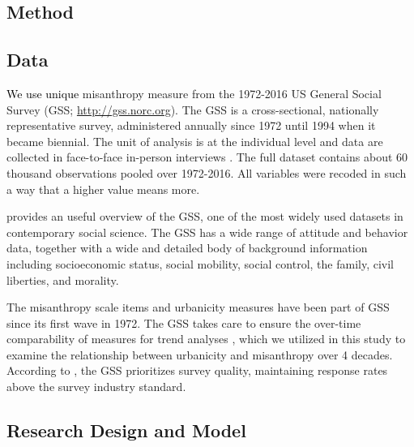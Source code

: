 \documentclass[11pt, letterpaper]{article}
\newcommand{\hilite}[1]{\textcolor{black}{#1}}
\begin{document}
\begin{spacing}{1.4}

\section*{Method} 

\subsection*{Data}

\hilite{We use unique} misanthropy measure from the 1972-2016 US General Social Survey (GSS;
\url{http://gss.norc.org}). The GSS is a cross-sectional, nationally
representative survey, administered annually since 1972 until 1994 when it
became biennial. The unit of analysis is at the individual level and data are collected in face-to-face in-person interviews \citep{davis07}. The full dataset contains about 60 thousand observations pooled over 1972-2016. All variables were recoded in such a way that a higher value means more. 

\citet{marsden20} provides an useful overview  of the GSS, one of the most
widely used datasets in contemporary social science. The GSS has a wide range of
attitude and behavior data, together with a wide and detailed body of background
information including socioeconomic status, social mobility,
social control, the family, civil liberties, and morality. %
%

The misanthropy scale items and urbanicity
measures have been part of GSS since its first wave in 1972. 
 The GSS takes care to ensure the over-time comparability of measures for trend analyses \citep{marsden20}, which we utilized in this study to examine the relationship between urbanicity and misanthropy over 4 decades. According to \citet{marsden20}, the GSS prioritizes survey quality, maintaining response rates above the survey industry standard.

\subsection*{Research Design and Model}


\end{spacing}
\end{document}
